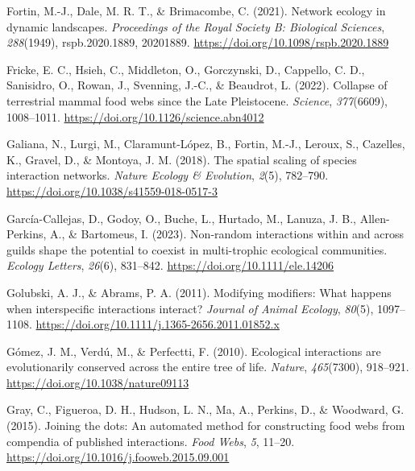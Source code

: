 \documentclass[
]{article}
\newlength{\cslhangindent}
\newenvironment{CSLReferences}[2] %
 {\begin{list}{}{%
  \setlength{\itemindent}{0pt}
  \setlength{\leftmargin}{0pt}
  \setlength{\parsep}{0pt}
  \ifodd #1
   \setlength{\leftmargin}{\cslhangindent}
   \setlength{\itemindent}{-1\cslhangindent}
  \fi
  \setlength{\itemsep}{#2\baselineskip}}}
 {\end{list}}
\begin{document}
\begin{CSLReferences}{1}{0}
Fortin, M.-J., Dale, M. R. T., \& Brimacombe, C. (2021). Network ecology
in dynamic landscapes. \emph{Proceedings of the Royal Society B:
Biological Sciences}, \emph{288}(1949), rspb.2020.1889, 20201889.
\url{https://doi.org/10.1098/rspb.2020.1889}

Fricke, E. C., Hsieh, C., Middleton, O., Gorczynski, D., Cappello, C.
D., Sanisidro, O., Rowan, J., Svenning, J.-C., \& Beaudrot, L. (2022).
Collapse of terrestrial mammal food webs since the {Late Pleistocene}.
\emph{Science}, \emph{377}(6609), 1008--1011.
\url{https://doi.org/10.1126/science.abn4012}

Galiana, N., Lurgi, M., Claramunt-López, B., Fortin, M.-J., Leroux, S.,
Cazelles, K., Gravel, D., \& Montoya, J. M. (2018). The spatial scaling
of species interaction networks. \emph{Nature Ecology \& Evolution},
\emph{2}(5), 782--790. \url{https://doi.org/10.1038/s41559-018-0517-3}

García-Callejas, D., Godoy, O., Buche, L., Hurtado, M., Lanuza, J. B.,
Allen-Perkins, A., \& Bartomeus, I. (2023). Non-random interactions
within and across guilds shape the potential to coexist in multi-trophic
ecological communities. \emph{Ecology Letters}, \emph{26}(6), 831--842.
\url{https://doi.org/10.1111/ele.14206}

Golubski, A. J., \& Abrams, P. A. (2011). Modifying modifiers: What
happens when interspecific interactions interact? \emph{Journal of
Animal Ecology}, \emph{80}(5), 1097--1108.
\url{https://doi.org/10.1111/j.1365-2656.2011.01852.x}

Gómez, J. M., Verdú, M., \& Perfectti, F. (2010). Ecological
interactions are evolutionarily conserved across the entire tree of
life. \emph{Nature}, \emph{465}(7300), 918--921.
\url{https://doi.org/10.1038/nature09113}

Gray, C., Figueroa, D. H., Hudson, L. N., Ma, A., Perkins, D., \&
Woodward, G. (2015). Joining the dots: {An} automated method for
constructing food webs from compendia of published interactions.
\emph{Food Webs}, \emph{5}, 11--20.
\url{https://doi.org/10.1016/j.fooweb.2015.09.001}


\end{CSLReferences}
\end{document}
